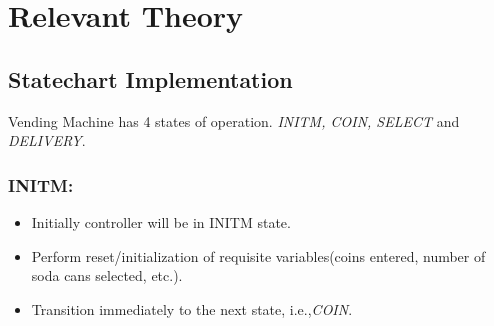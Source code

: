 \documentclass{article}
\begin{document}
\section{Relevant Theory}
\subsection{Statechart Implementation}
\qquad Vending Machine has 4 states of operation. \textit{INITM, COIN, SELECT} and \textit{DELIVERY}.
\subsubsection{INITM:}
\begin{itemize}
    \item Initially controller will be in INITM state.
    \item Perform reset/initialization of requisite variables(coins entered, number of soda cans selected, etc.).
    \item Transition immediately to the next state, i.e.,\textit{COIN}.
\end{itemize}
\end{document}
